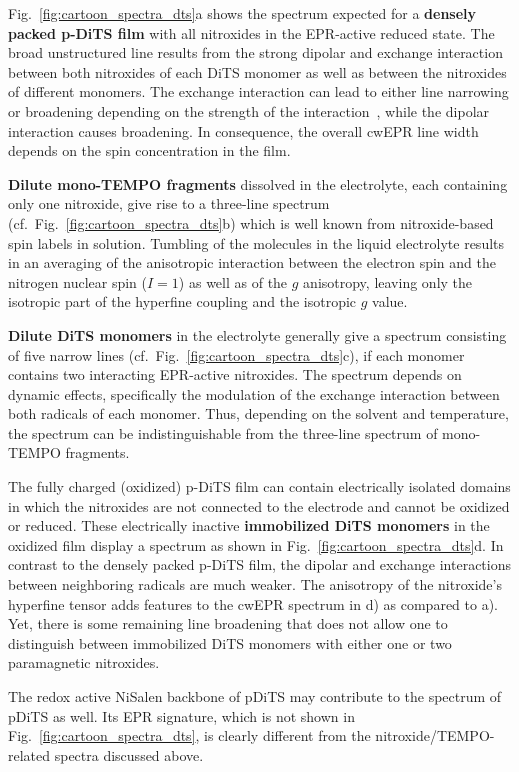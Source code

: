 Fig.~\ref{fig:cartoon_spectra_dts}a shows the spectrum expected for a \textbf{densely packed p-DiTS film} with all nitroxides in the EPR-active reduced state. The broad unstructured line results from the strong dipolar and exchange interaction between both nitroxides of each DiTS monomer as well as between the nitroxides of different monomers. The exchange interaction can lead to either line narrowing or broadening depending on the strength of the interaction~\cite{Anderson1953}, while the dipolar interaction causes broadening. In consequence, the overall cwEPR line width depends on the spin concentration in the film.
\par 
\textbf{Dilute mono-TEMPO fragments} dissolved in the electrolyte, each containing only one nitroxide, give rise to a three-line spectrum (cf.\ Fig.~\ref{fig:cartoon_spectra_dts}b) which is well known from nitroxide-based spin labels in solution.\cite{Liu_2008} Tumbling of the molecules in the liquid electrolyte results in an averaging of the anisotropic interaction between the electron spin and the nitrogen nuclear spin ($I = 1$) as well as of the $g$ anisotropy, leaving only the isotropic part of the hyperfine coupling and the isotropic $g$ value. 
\par
\textbf{Dilute DiTS monomers} in the electrolyte generally give a spectrum consisting of five narrow lines (cf.\ Fig.~\ref{fig:cartoon_spectra_dts}c), if each monomer contains two interacting EPR-active nitroxides. The spectrum depends on dynamic effects, specifically the modulation of the exchange interaction between both radicals of each monomer.  Thus, depending on the solvent and temperature, the spectrum can be indistinguishable from the three-line spectrum of mono-TEMPO fragments.
\par
The fully charged (oxidized) p-DiTS film can contain electrically isolated domains in which the nitroxides are not connected to the electrode and cannot be oxidized or reduced. These electrically inactive \textbf{immobilized DiTS monomers} in the oxidized film display a spectrum as shown in Fig.~\ref{fig:cartoon_spectra_dts}d. In contrast to the densely packed p-DiTS film, the dipolar and exchange interactions between neighboring radicals are much weaker. The anisotropy of the nitroxide's hyperfine tensor adds features to the cwEPR spectrum in d) as compared to a).
Yet, there is some remaining line broadening that does not allow one to distinguish between immobilized DiTS monomers with either one or two paramagnetic nitroxides.
\par
The redox active NiSalen backbone of pDiTS may contribute to the spectrum of pDiTS as well. Its EPR signature, which is not shown in Fig.~\ref{fig:cartoon_spectra_dts}, is clearly different from the nitroxide/TEMPO-related spectra discussed above.
%

